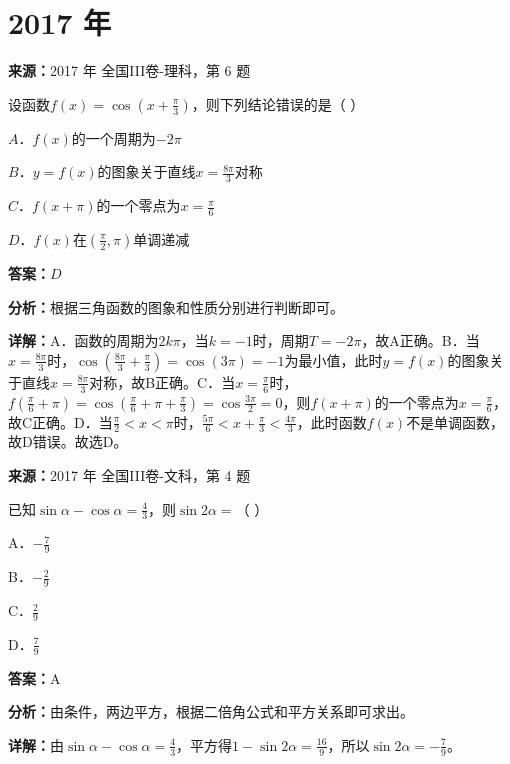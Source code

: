 \section*{2017 年}

\begin{question}[points=5]
\textbf{来源：}2017 年 全国III卷-理科，第 6 题\par
设函数$f(x)=\cos(x+\frac{\pi}{3})$，则下列结论错误的是（ ）
\begin{choices}
  \item $A$．$f(x)$的一个周期为$-2\pi$
  \item $B$．$y=f(x)$的图象关于直线$x=\frac{8\pi}{3}$对称
  \item $C$．$f(x+\pi)$的一个零点为$x=\frac{\pi}{6}$
  \item $D$．$f(x)$在$(\frac{\pi}{2},\pi)$单调递减
\end{choices}
\begin{solution}
\textbf{答案：}$D$

\textbf{分析：}根据三角函数的图象和性质分别进行判断即可。

\textbf{详解：}A．函数的周期为$2k\pi$，当$k=-1$时，周期$T=-2\pi$，故A正确。B．当$x=\frac{8\pi}{3}$时，$\cos(\frac{8\pi}{3}+\frac{\pi}{3})=\cos(3\pi)=-1$为最小值，此时$y=f(x)$的图象关于直线$x=\frac{8\pi}{3}$对称，故B正确。C．当$x=\frac{\pi}{6}$时，$f(\frac{\pi}{6}+\pi)=\cos(\frac{\pi}{6}+\pi+\frac{\pi}{3})=\cos\frac{3\pi}{2}=0$，则$f(x+\pi)$的一个零点为$x=\frac{\pi}{6}$，故C正确。D．当$\frac{\pi}{2}<x<\pi$时，$\frac{5\pi}{6}<x+\frac{\pi}{3}<\frac{4\pi}{3}$，此时函数$f(x)$不是单调函数，故D错误。故选D。
\end{solution}
\end{question}

\begin{question}[points=5]
\textbf{来源：}2017 年 全国III卷-文科，第 4 题\par
已知$\sin\alpha-\cos\alpha=\frac{4}{3}$，则$\sin2\alpha=$（    ）
\begin{choices}
  \item A．$-\frac{7}{9}$
  \item B．$-\frac{2}{9}$
  \item C．$\frac{2}{9}$
  \item D．$\frac{7}{9}$
\end{choices}
\begin{solution}
\textbf{答案：}A

\textbf{分析：}由条件，两边平方，根据二倍角公式和平方关系即可求出。

\textbf{详解：}由$\sin\alpha-\cos\alpha=\frac{4}{3}$，平方得$1-\sin2\alpha=\frac{16}{9}$，所以$\sin2\alpha=-\frac{7}{9}$。
\end{solution}
\end{question}

